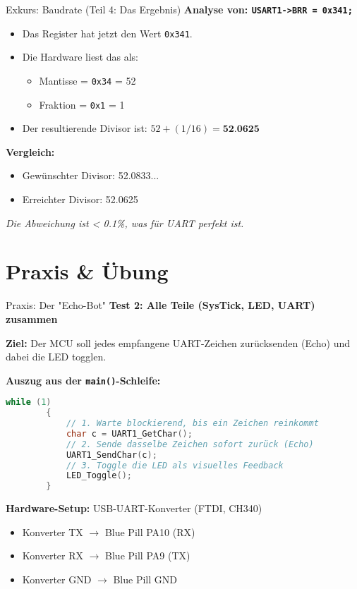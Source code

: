 \documentclass{beamer}
\begin{document}
\begin{frame}[fragile]{Exkurs: Baudrate (Teil 4: Das Ergebnis)}
	\textbf{Analyse von: \texttt{USART1->BRR = 0x341;}}
	
	\begin{itemize}
		\item Das Register hat jetzt den Wert \texttt{0x341}.
		\item Die Hardware liest das als:
		\begin{itemize}
			\item Mantisse = \texttt{0x34} = 52
			\item Fraktion = \texttt{0x1} = 1
		\end{itemize}
		\item Der resultierende Divisor ist: $52 + (1/16) = \textbf{52.0625}$
	\end{itemize}
	
	\medskip
	\textbf{Vergleich:}
	\begin{itemize}
		\item Gewünschter Divisor: 52.0833...
		\item Erreichter Divisor: 52.0625
	\end{itemize}
	\rightarrow \textit{Die Abweichung ist < 0.1\%, was für UART perfekt ist.}
\end{frame}

\section{Praxis \& Übung}

\begin{frame}[fragile]{Praxis: Der "Echo-Bot"}
	\textbf{Test 2: Alle Teile (SysTick, LED, UART) zusammen}
	
	\medskip
	\textbf{Ziel:} Der MCU soll jedes empfangene UART-Zeichen zurücksenden (Echo) und dabei die LED togglen.
	
	\bigskip
	\textbf{Auszug aus der \texttt{main()}-Schleife:}
	\begin{lstlisting}[language=C, style=mystyle]
		while (1)
		{
			// 1. Warte blockierend, bis ein Zeichen reinkommt
			char c = UART1_GetChar();
			// 2. Sende dasselbe Zeichen sofort zurück (Echo)
			UART1_SendChar(c);
			// 3. Toggle die LED als visuelles Feedback
			LED_Toggle();
		}
	\end{lstlisting}
	
	\medskip
	\textbf{Hardware-Setup:} USB-UART-Konverter (FTDI, CH340)
	\begin{itemize}
		\item Konverter TX $\rightarrow$ Blue Pill PA10 (RX)
		\item Konverter RX $\rightarrow$ Blue Pill PA9 (TX)
		\item Konverter GND $\rightarrow$ Blue Pill GND
	\end{itemize}
\end{frame}
\end{document}
